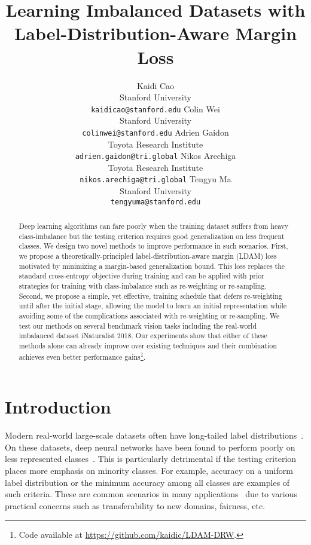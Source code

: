 \documentclass{article}
\title{Learning Imbalanced Datasets with Label-Distribution-Aware Margin Loss}
\author{Kaidi Cao \\ 
  Stanford University\\
  \texttt{kaidicao@stanford.edu}
  \And 
  Colin Wei \\ 
  Stanford University\\
  \texttt{colinwei@stanford.edu}
  \And
  Adrien Gaidon \\
  Toyota Research Institute \\
  \texttt{adrien.gaidon@tri.global}
  \And
  Nikos Arechiga \\
  Toyota Research Institute \\
  \texttt{nikos.arechiga@tri.global}
  \And
  Tengyu Ma \\ 
  Stanford University\\
  \texttt{tengyuma@stanford.edu}
}
\begin{document}
\maketitle

\begin{abstract}
Deep learning algorithms can fare poorly when the training dataset suffers from heavy class-imbalance but the testing criterion requires good generalization on less frequent classes. We design two novel methods to improve performance in such scenarios. First, we propose a theoretically-principled label-distribution-aware margin (LDAM) loss motivated by minimizing a margin-based generalization bound. This loss replaces the standard cross-entropy objective during training and can be applied with prior strategies for training with class-imbalance such as re-weighting or re-sampling. Second, we propose a simple, yet effective, training schedule that defers re-weighting until after the initial stage, allowing the model to learn an initial representation while avoiding some of the complications associated with re-weighting or re-sampling. We test our methods on several benchmark vision tasks including the real-world imbalanced dataset iNaturalist 2018. Our experiments show that either of these methods alone can already improve over existing techniques and their combination achieves even better performance gains\footnote{Code available at \url{https://github.com/kaidic/LDAM-DRW}.}.
\end{abstract}

\section{Introduction}



Modern real-world large-scale datasets often have long-tailed label distributions~\citep{van2017devil,krishna2017visual,lin2014microsoft,everingham2010pascal,guo2016ms,thomee2015yfcc100m,liu2019large}. On these datasets, deep neural networks have been found to perform poorly on less
represented classes~\citep{he2008learning, van2017devil,buda2018systematic}. This is particularly detrimental if the testing criterion places more emphasis on minority classes. For example, accuracy on a uniform label distribution or the minimum accuracy among all classes are examples of such criteria. These are common scenarios in many applications~\citep{cao2018pose,merler2019diversity,hinnefeld2018evaluating} due to various practical concerns such as transferability to new domains, fairness, etc. 
\end{document}
